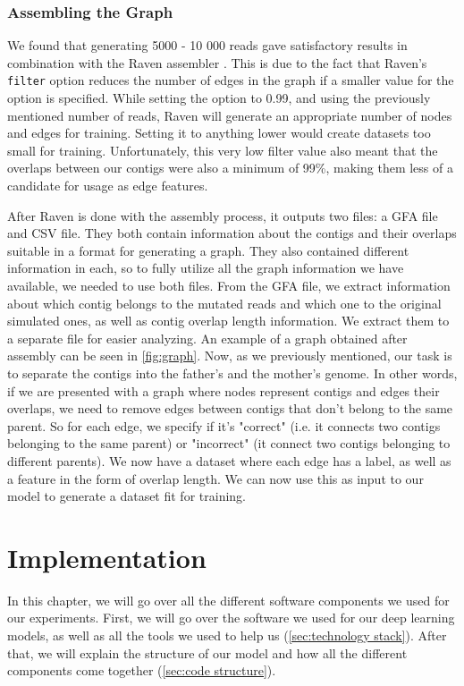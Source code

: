 \documentclass[times, utf8, diplomski, english]{fer_eng}
\begin{document}
\subsection{Assembling the Graph}

We found that generating 5000 - 10 000 reads gave satisfactory results in combination with the Raven assembler \cite{Vaser}. This is due to the fact that Raven's \texttt{filter} option reduces the number of edges in the graph if a smaller value for the option is specified. While setting the option to 0.99, and using the previously mentioned number of reads, Raven will generate an appropriate number of nodes and edges for training. Setting it to anything lower would create datasets too small for training. Unfortunately, this very low filter value also meant that the overlaps between our contigs were also a minimum of 99\%, making them less of a candidate for usage as edge features.

After Raven is done with the assembly process, it outputs two files: a GFA file and CSV file. They both contain information about the contigs and their overlaps suitable in a format for generating a graph. They also contained different information in each, so to fully utilize all the graph information we have available, we needed to use both files. From the GFA file, we extract information about which contig belongs to the mutated reads and which one to the original simulated ones, as well as contig overlap length information. We extract them to a separate file for easier analyzing. An example of a graph obtained after assembly can be seen in \ref{fig:graph}. Now, as we previously mentioned, our task is to separate the contigs into the father's and the mother's genome. In other words, if we are presented with a graph where nodes represent contigs and edges their overlaps, we need to remove edges between contigs that don't belong to the same parent. So for each edge, we specify if it's "correct" (i.e. it connects two contigs belonging to the same parent) or "incorrect" (it connect two contigs belonging to different parents). We now have a dataset where each edge has a label, as well as a feature in the form of overlap length. We can now use this as input to our model to generate a dataset fit for training.

\chapter{Implementation}

In this chapter, we will go over all the different software components we used for our experiments. First, we will go over the software we used for our deep learning models, as well as all the tools we used to help us (\ref{sec:technology stack}). After that, we will explain the structure of our model and how all the different components come together (\ref{sec:code structure}).
\end{document}
